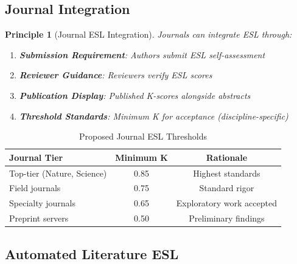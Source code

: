 \documentclass[11pt,a4paper]{article}
\newtheorem{principle}{Principle}[section]
\theoremstyle{remark}
\begin{document}
\subsection{Journal Integration}

\begin{principle}[Journal ESL Integration]
\label{princ:journal-esl}
Journals can integrate ESL through:
\begin{enumerate}
    \item \textbf{Submission Requirement}: Authors submit ESL self-assessment
    \item \textbf{Reviewer Guidance}: Reviewers verify ESL scores
    \item \textbf{Publication Display}: Published K-scores alongside abstracts
    \item \textbf{Threshold Standards}: Minimum K for acceptance (discipline-specific)
\end{enumerate}
\end{principle}

\begin{table}[h]
\centering
\caption{Proposed Journal ESL Thresholds}
\label{tab:journal-thresholds}
\begin{tabular}{lcc}
\toprule
\textbf{Journal Tier} & \textbf{Minimum K} & \textbf{Rationale} \\
\midrule
Top-tier (Nature, Science) & 0.85 & Highest standards \\
Field journals & 0.75 & Standard rigor \\
Specialty journals & 0.65 & Exploratory work accepted \\
Preprint servers & 0.50 & Preliminary findings \\
\bottomrule
\end{tabular}
\end{table}

\subsection{Automated Literature ESL}
\end{document}
